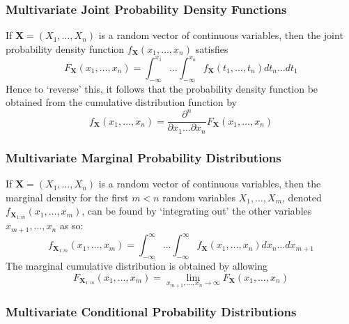 \documentclass[11pt]{report} %
\begin{document}
\subsubsection{Multivariate Joint Probability Density Functions}

If $\mathbf{X} = \left(X_{1}, \dots, X_{n}\right)$ is a random vector of continuous variables, then the joint probability density function $f_{\mathbf{X}}\left(x_{1}, \dots, x_{n}\right)$ satisfies
\begin{equation}
F_{\mathbf{X}}\left(x_{1}, \dots, x_{n}\right) = \int_{-\infty}^{x_{1}}\dots\int_{-\infty}^{x_{n}}f_{\mathbf{X}}\left(t_{1}, \dots, t_{n}\right)dt_{n}\dots dt_{1}
\end{equation}
Hence to `reverse' this, it follows that the probability density function be obtained from the cumulative distribution function by
\begin{equation}
f_{\mathbf{X}}\left(x_{1}, \dots, x_{n}\right) = \dfrac{\partial^{n}}{\partial x_{1}\dots\partial x_{n}}F_{\mathbf{X}}\left(x_{1}, \dots, x_{n}\right)
\end{equation}

\subsubsection{Multivariate Marginal Probability Distributions}

If $\mathbf{X} = \left(X_{1}, \dots, X_{n}\right)$ is a random vector of continuous variables, then the marginal density for the first $m < n$ random variables $X_{1}, \dots, X_{m}$, denoted $f_{\mathbf{X}_{1:m}}\left(x_{1}, \dots, x_{m}\right)$, can be found by `integrating out' the other variables $x_{m + 1}, \dots, x_{n}$ as so:
\begin{equation}
f_{\mathbf{X}_{1:m}}\left(x_{1}, \dots, x_{m}\right) = \int_{-\infty}^{\infty}\dots\int_{-\infty}^{\infty}f_{\mathbf{X}}\left(x_{1}, \dots, x_{n}\right)dx_{n}\dots dx_{m + 1}
\end{equation}
The marginal cumulative distribution is obtained by allowing
\begin{equation}
F_{\mathbf{X}_{1:m}}\left(x_{1}, \dots, x_{m}\right) = \lim_{x_{m + 1}, \dots, x_{n} \to\infty}F_{\mathbf{X}}\left(x_{1}, \dots, x_{n}\right)
\end{equation}

\subsubsection{Multivariate Conditional Probability Distributions}
\end{document}
